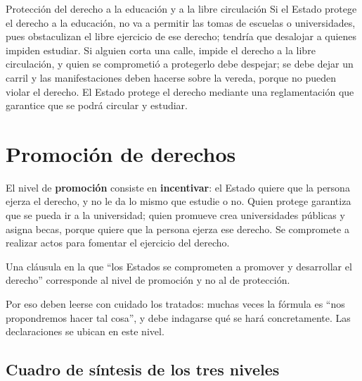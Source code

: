 \documentclass[12pt,oneside]{book}
\begin{document}
\begin{example}{Protección del derecho a la educación y a la libre circulación}
Si el Estado protege el derecho a la educación, no va a permitir las tomas de escuelas o universidades, pues obstaculizan el libre ejercicio de ese derecho; tendría que desalojar a quienes impiden estudiar. Si alguien corta una calle, impide el derecho a la libre circulación, y quien se comprometió a protegerlo debe despejar; se debe dejar un carril y las manifestaciones deben hacerse sobre la vereda, porque no pueden violar el derecho. El Estado protege el derecho mediante una reglamentación que garantice que se podrá circular y estudiar.
\end{example}

\section{Promoción de derechos}

El nivel de \textbf{promoción} consiste en \textbf{incentivar}: el Estado quiere que la persona ejerza el derecho, y no le da lo mismo que estudie o no. Quien protege garantiza que se pueda ir a la universidad; quien promueve crea universidades públicas y asigna becas, porque quiere que la persona ejerza ese derecho. Se compromete a realizar actos para fomentar el ejercicio del derecho.

Una cláusula en la que ``los Estados se comprometen a promover y desarrollar el derecho'' corresponde al nivel de promoción y no al de protección.

Por eso deben leerse con cuidado los tratados: muchas veces la fórmula es ``nos propondremos hacer tal cosa'', y debe indagarse qué se hará concretamente. Las declaraciones se ubican en este nivel.

\subsection{Cuadro de síntesis de los tres niveles}
\end{document}
